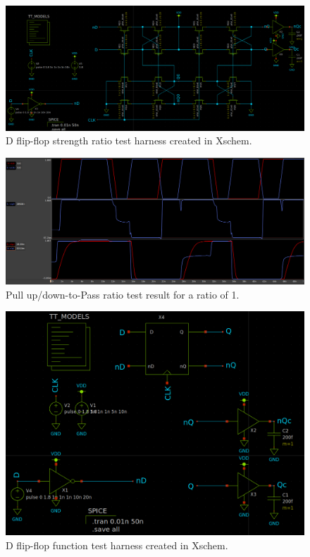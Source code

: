 \documentclass[11pt]{article}
\begin{document}
    \begin{figure}[!ht]
        \includegraphics[width=\linewidth]{../img/dff_stest_harness.png}
        \caption{D flip-flop strength ratio test harness created in Xschem.}
        \label{fig:dff_stest}
    \end{figure}
    \begin{figure}[!ht]
        \includegraphics[width=\linewidth]{../img/S_1}
        \caption{Pull up/down-to-Pass ratio test result for a ratio of 1.}
        \label{fig:dff_s1}
    \end{figure}
    \begin{figure}[!ht]
        \includegraphics[width=\linewidth]{../img/dff_test_harness.png}
        \caption{D flip-flop function test harness created in Xschem.}
        \label{fig:dff_test}
    \end{figure}
\end{document}
